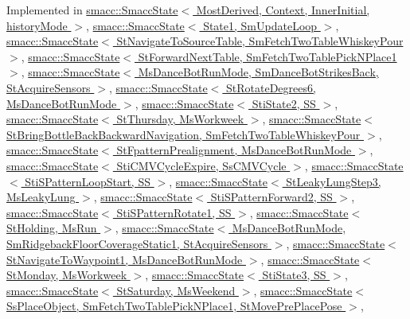 Implemented in \hyperlink{classsmacc_1_1SmaccState_afc39f8e0ca4001b2159a100da2fccd0e}{smacc\+::\+Smacc\+State$<$ Most\+Derived, Context, Inner\+Initial, history\+Mode $>$}, \hyperlink{classsmacc_1_1SmaccState_afc39f8e0ca4001b2159a100da2fccd0e}{smacc\+::\+Smacc\+State$<$ State1, Sm\+Update\+Loop $>$}, \hyperlink{classsmacc_1_1SmaccState_afc39f8e0ca4001b2159a100da2fccd0e}{smacc\+::\+Smacc\+State$<$ St\+Navigate\+To\+Source\+Table, Sm\+Fetch\+Two\+Table\+Whiskey\+Pour $>$}, \hyperlink{classsmacc_1_1SmaccState_afc39f8e0ca4001b2159a100da2fccd0e}{smacc\+::\+Smacc\+State$<$ St\+Forward\+Next\+Table, Sm\+Fetch\+Two\+Table\+Pick\+N\+Place1 $>$}, \hyperlink{classsmacc_1_1SmaccState_afc39f8e0ca4001b2159a100da2fccd0e}{smacc\+::\+Smacc\+State$<$ Ms\+Dance\+Bot\+Run\+Mode, Sm\+Dance\+Bot\+Strikes\+Back, St\+Acquire\+Sensors $>$}, \hyperlink{classsmacc_1_1SmaccState_afc39f8e0ca4001b2159a100da2fccd0e}{smacc\+::\+Smacc\+State$<$ St\+Rotate\+Degrees6, Ms\+Dance\+Bot\+Run\+Mode $>$}, \hyperlink{classsmacc_1_1SmaccState_afc39f8e0ca4001b2159a100da2fccd0e}{smacc\+::\+Smacc\+State$<$ Sti\+State2, S\+S $>$}, \hyperlink{classsmacc_1_1SmaccState_afc39f8e0ca4001b2159a100da2fccd0e}{smacc\+::\+Smacc\+State$<$ St\+Thursday, Ms\+Workweek $>$}, \hyperlink{classsmacc_1_1SmaccState_afc39f8e0ca4001b2159a100da2fccd0e}{smacc\+::\+Smacc\+State$<$ St\+Bring\+Bottle\+Back\+Backward\+Navigation, Sm\+Fetch\+Two\+Table\+Whiskey\+Pour $>$}, \hyperlink{classsmacc_1_1SmaccState_afc39f8e0ca4001b2159a100da2fccd0e}{smacc\+::\+Smacc\+State$<$ St\+Fpattern\+Prealignment, Ms\+Dance\+Bot\+Run\+Mode $>$}, \hyperlink{classsmacc_1_1SmaccState_afc39f8e0ca4001b2159a100da2fccd0e}{smacc\+::\+Smacc\+State$<$ Sti\+C\+M\+V\+Cycle\+Expire, Ss\+C\+M\+V\+Cycle $>$}, \hyperlink{classsmacc_1_1SmaccState_afc39f8e0ca4001b2159a100da2fccd0e}{smacc\+::\+Smacc\+State$<$ Sti\+S\+Pattern\+Loop\+Start, S\+S $>$}, \hyperlink{classsmacc_1_1SmaccState_afc39f8e0ca4001b2159a100da2fccd0e}{smacc\+::\+Smacc\+State$<$ St\+Leaky\+Lung\+Step3, Ms\+Leaky\+Lung $>$}, \hyperlink{classsmacc_1_1SmaccState_afc39f8e0ca4001b2159a100da2fccd0e}{smacc\+::\+Smacc\+State$<$ Sti\+S\+Pattern\+Forward2, S\+S $>$}, \hyperlink{classsmacc_1_1SmaccState_afc39f8e0ca4001b2159a100da2fccd0e}{smacc\+::\+Smacc\+State$<$ Sti\+S\+Pattern\+Rotate1, S\+S $>$}, \hyperlink{classsmacc_1_1SmaccState_afc39f8e0ca4001b2159a100da2fccd0e}{smacc\+::\+Smacc\+State$<$ St\+Holding, Ms\+Run $>$}, \hyperlink{classsmacc_1_1SmaccState_afc39f8e0ca4001b2159a100da2fccd0e}{smacc\+::\+Smacc\+State$<$ Ms\+Dance\+Bot\+Run\+Mode, Sm\+Ridgeback\+Floor\+Coverage\+Static1, St\+Acquire\+Sensors $>$}, \hyperlink{classsmacc_1_1SmaccState_afc39f8e0ca4001b2159a100da2fccd0e}{smacc\+::\+Smacc\+State$<$ St\+Navigate\+To\+Waypoint1, Ms\+Dance\+Bot\+Run\+Mode $>$}, \hyperlink{classsmacc_1_1SmaccState_afc39f8e0ca4001b2159a100da2fccd0e}{smacc\+::\+Smacc\+State$<$ St\+Monday, Ms\+Workweek $>$}, \hyperlink{classsmacc_1_1SmaccState_afc39f8e0ca4001b2159a100da2fccd0e}{smacc\+::\+Smacc\+State$<$ Sti\+State3, S\+S $>$}, \hyperlink{classsmacc_1_1SmaccState_afc39f8e0ca4001b2159a100da2fccd0e}{smacc\+::\+Smacc\+State$<$ St\+Saturday, Ms\+Weekend $>$}, \hyperlink{classsmacc_1_1SmaccState_afc39f8e0ca4001b2159a100da2fccd0e}{smacc\+::\+Smacc\+State$<$ Ss\+Place\+Object, Sm\+Fetch\+Two\+Table\+Pick\+N\+Place1, St\+Move\+Pre\+Place\+Pose $>$}, 